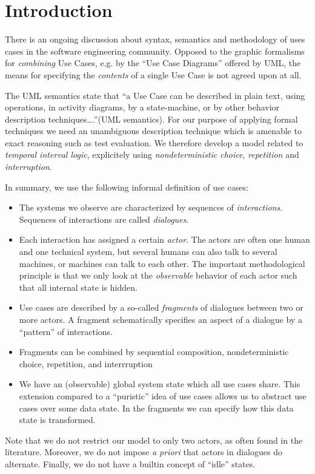 \section{Introduction}

There is an ongoing discussion about syntax, semantics and methodology
of uses cases in the software engineering community.  Opposed to the graphic formalisms for
\emph{combining} Use Cases, e.g. by the ``Use Case Diagrams'' offered
by UML, the means for specifying the
\emph{contents} of a single Use Case 
is not agreed upon at all.

The UML semantics state that ``a Use Case can be described in plain
text, using operations, in activity diagrams, by a state-machine, or
by other behavior description techniques\ldots.''(UML semantics).  For
our purpose of applying formal techniques we need an unambiguous
description technique which is amenable to exact reasoning such as
test evaluation.  We therefore develop a model related to
\emph{temporal interval logic}, explicitely using
\emph{nondeterministic choice}, \emph{repetition} and
\emph{interruption}.

In summary, we use the following informal definition of use cases:

\begin{itemize}
  
\item The systems we observe are characterized by sequences of
  \emph{interactions}. Sequences of interactions are called
  \emph{dialogues}.  
\item Each interaction has assigned a certain \emph{actor}.  The
  actors are often one human and one technical system, but
  several humans can also talk to several machines, or machines can
  talk to each other.  The important methodological principle is that
  we only look at the \emph{observable} behavior of each actor
  such that all internal state is hidden.
  
\item Use cases are described by a so-called \emph{fragments} of 
  dialogues between two or more actors. A fragment schematically
  specifies an aspect of a dialogue by a ``pattern'' of
  interactions. 
  
\item Fragments can be combined by sequential composition,
  nondeterministic choice, repetition, and interrruption
  
\item We have an (observable) global system state which all use cases
  share.  This extension compared to a ``puristic'' idea of use cases
  allows us to abstract use cases over some data state. In the
  fragments we can specify how this data state is transformed.
\end{itemize}

Note that we do not restrict our model to only two actors, as often
found in the literature.  Moreover, we do not impose \emph{a priori}
that actors in dialogues do alternate.  Finally, we do not have a
builtin concept of ``idle'' states.
